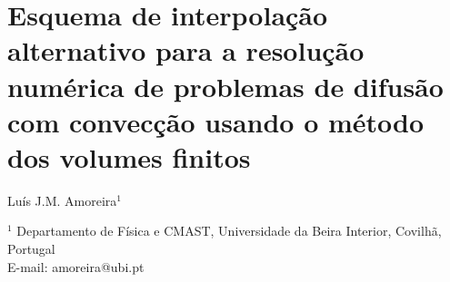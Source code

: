 \documentclass[11pt,twoside]{article}
\begin{document}

\section*{Esquema de interpolação alternativo para a resolução numérica de
problemas de difusão com convecção usando o método dos volumes finitos}

\vspace{10pt}


Luís J.M. Amoreira$^{1}$%

\vspace{10pt}



{
\center

    \footnotesize

$^{1}$ Departamento de Física e CMAST, Universidade da Beira Interior, Covilhã, 
Portugal \\
E-mail: amoreira@ubi.pt

%
%
%
%
}

\vspace{25pt}

\end{document}
